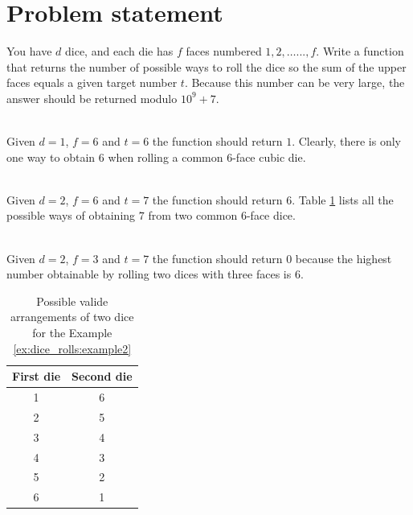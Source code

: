 \section{Problem statement}
\begin{exercise}
You have $d$ dice, and each die has $f$ faces numbered $1, 2, \ldots..., f$.
Write a function that returns the number of possible ways to roll the dice
so the sum of the upper
faces equals a given target number $t$. Because this number can be very large, the answer
should be returned modulo $10^9 + 7$.
	

	\begin{example}
		\hfill \\
		Given $d=1$, $f=6$ and $t=6$ the function should return $1$. Clearly, there is only one way to obtain $6$ when rolling a common $6$-face cubic die.
	\end{example}

	\begin{example}
		\label{ex:dice_rolls:example2}
		\hfill \\
		Given $d=2$, $f=6$ and $t=7$ the function should return $6$. Table \ref{tab:dice_rolls:arrangements_example2} lists all the possible ways of obtaining $7$ from two common $6$-face dice.
	\end{example}

	\begin{example}
		\hfill \\
		Given $d=2$, $f=3$ and $t=7$ the function should return $0$ because the highest number	obtainable by rolling two dices with three faces is $6$.
	\end{example}
\end{exercise}

\begin{table}
	\centering
	\begin{tabular}{|c|c|} 
	\hline
	\textbf{First die} & \textbf{Second die}  \\ 
	\hline
	1                  & 6                    \\
	2                  & 5                    \\
	3                  & 4                    \\
	4                  & 3                    \\
	5                  & 2                    \\
	6                  & 1                    \\
	\hline
	\end{tabular}
	\caption{Possible valide arrangements of two dice for the Example \ref{ex:dice_rolls:example2}}
	\label{tab:dice_rolls:arrangements_example2}
\end{table}


